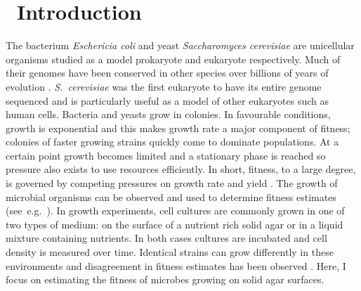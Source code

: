 \graphicspath{{images/}}

\section{\thesection~Introduction}
\label{sec:introduction}

The bacterium \textit{Eschericia coli} and yeast \textit{Saccharomyces
  cerevisiae} are unicellular organisms studied as a model prokaryote
and eukaryote respectively.
Much of their genomes have been conserved in other species over
billions of years of evolution
\citep{OBrien2005inparanoid}. \textit{S.~cerevisiae} was the first
eukaryote to have its entire genome sequenced \citep{goffeau1996life}
and is particularly useful as a model of other eukaryotes such as
human cells. Bacteria and yeasts grow in colonies. In favourable
conditions, growth is exponential and this makes growth rate a major
component of fitness; colonies of faster growing strains quickly come
to dominate populations. At a certain point growth becomes limited and
a stationary phase is reached so pressure also exists to use resources
efficiently. In short, fitness, to a large degree, is governed by
competing pressures on growth rate and yield
\citep{dethlefsen2007performance}. The growth of microbial organisms
can be observed and used to determine fitness estimates
(see~e.g.~\citet{Baryshnikova2010,Addinall2011}). In growth
experiments, cell cultures are commonly grown in one of two types of
medium: on the surface of a nutrient rich solid agar or in a liquid
mixture containing nutrients. In both cases cultures are incubated and
cell density is measured over time. Identical strains can grow
differently in these environments and disagreement in fitness
estimates has been observed \citep{Baryshnikova2010}. Here, I focus on
estimating the fitness of microbes growing on solid agar surfaces.


